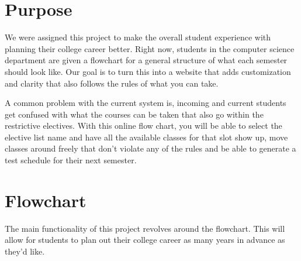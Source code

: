 \documentclass[12pt]{article}
\begin{document}
\maketitle

\clearpage

\section*{Purpose}

We were assigned this project to make the overall student experience with planning their college career better. Right now, students in the computer science department are given a flowchart for a general structure of what each semester should look like. Our goal is to turn this into a website that adds customization and clarity that also follows the rules of what you can take.

A common problem with the current system is, incoming and current students get confused with what the courses can be taken that also go within the restrictive electives. With this online flow chart, you will be able to select the elective list name and have all the available classes for that slot show up, move classes around freely that don’t violate any of the rules and be able to generate a test schedule for their next semester.


\section{Flowchart}

The main functionality of this project revolves around the flowchart. This will allow for students to plan out their college career as many years in advance as they’d like. 
\end{document}
